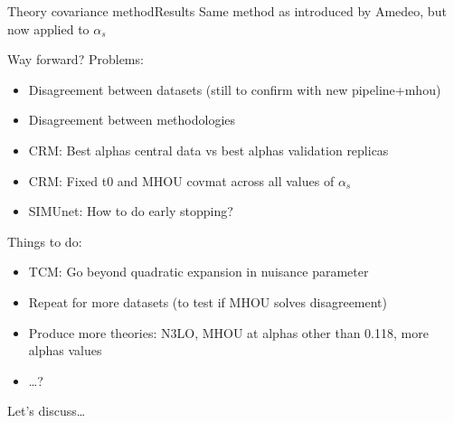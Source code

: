 \documentclass[aspectratio=169, 8pt,t]{beamer}
\begin{document}
\begin{frame}{Theory covariance method}{Results}
  Same method as introduced by Amedeo, but now applied to $\alpha_s$



\end{frame}



\begin{frame}{Way forward?}
  Problems:
  \begin{itemize}
    \item Disagreement between datasets (still to confirm with new pipeline+mhou)
    \item Disagreement between methodologies
    \item CRM: Best alphas central data vs best alphas validation replicas
    \item CRM: Fixed t0 and MHOU covmat across all values of $\alpha_s$
    \item SIMUnet: How to do early stopping?
  \end{itemize}

  Things to do:
  \begin{itemize}
    \item TCM: Go beyond quadratic expansion in nuisance parameter
    \item Repeat for more datasets (to test if MHOU solves disagreement)
    \item Produce more theories: N3LO, MHOU at alphas other than 0.118, more alphas values
    \item \ldots?
  \end{itemize}

  Let's discuss\ldots
\end{frame}
\end{document}
